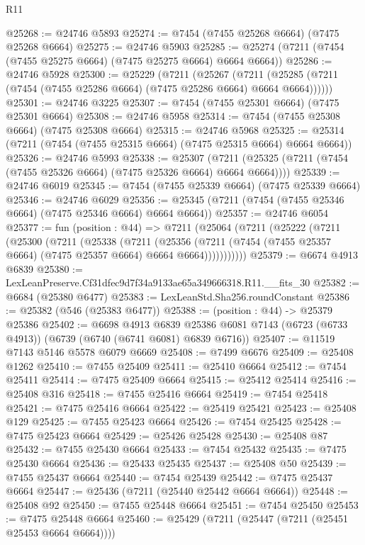 \begin{lexlean}{R11}
\begin{coremodule}
@25268 := @24746 @5893
@25274 := @7454 (@7455 @25268 @6664) (@7475 @25268 @6664)
@25275 := @24746 @5903
@25285 := @25274 (@7211 (@7454 (@7455 @25275 @6664) (@7475 @25275 @6664) @6664 @6664))
@25286 := @24746 @5928
@25300 := @25229
    (@7211
      (@25267
        (@7211 (@25285 (@7211 (@7454 (@7455 @25286 @6664) (@7475 @25286 @6664) @6664 @6664))))))
@25301 := @24746 @3225
@25307 := @7454 (@7455 @25301 @6664) (@7475 @25301 @6664)
@25308 := @24746 @5958
@25314 := @7454 (@7455 @25308 @6664) (@7475 @25308 @6664)
@25315 := @24746 @5968
@25325 := @25314 (@7211 (@7454 (@7455 @25315 @6664) (@7475 @25315 @6664) @6664 @6664))
@25326 := @24746 @5993
@25338 := @25307
    (@7211 (@25325 (@7211 (@7454 (@7455 @25326 @6664) (@7475 @25326 @6664) @6664 @6664))))
@25339 := @24746 @6019
@25345 := @7454 (@7455 @25339 @6664) (@7475 @25339 @6664)
@25346 := @24746 @6029
@25356 := @25345 (@7211 (@7454 (@7455 @25346 @6664) (@7475 @25346 @6664) @6664 @6664))
@25357 := @24746 @6054
@25377 := fun (position : @44) =>
  @7211
    (@25064
      (@7211
        (@25222
          (@7211
            (@25300
              (@7211
                (@25338
                  (@7211
                    (@25356
                      (@7211 (@7454 (@7455 @25357 @6664) (@7475 @25357 @6664) @6664 @6664)))))))))))
@25379 := @6674 @4913 @6839
@25380 := LexLeanPreserve.Cf31dfec9d7f34a9133ae65a349666318.R11.__fits_30
@25382 := @6684 (@25380 @6477)
@25383 := LexLeanStd.Sha256.roundConstant
@25386 := @25382 (@546 (@25383 @6477))
@25388 := (position : @44) -> @25379 @25386
@25402 := @6698
    @4913
    @6839
    @25386
    @6081
    @7143
    (@6723 (@6733 @4913))
    (@6739 (@6740 (@6741 @6081) @6839 @6716))
@25407 := @11519 @7143 @5146 @5578 @6079 @6669
@25408 := @7499 @6676
@25409 := @25408 @1262
@25410 := @7455 @25409
@25411 := @25410 @6664
@25412 := @7454 @25411
@25414 := @7475 @25409 @6664
@25415 := @25412 @25414
@25416 := @25408 @316
@25418 := @7455 @25416 @6664
@25419 := @7454 @25418
@25421 := @7475 @25416 @6664
@25422 := @25419 @25421
@25423 := @25408 @129
@25425 := @7455 @25423 @6664
@25426 := @7454 @25425
@25428 := @7475 @25423 @6664
@25429 := @25426 @25428
@25430 := @25408 @87
@25432 := @7455 @25430 @6664
@25433 := @7454 @25432
@25435 := @7475 @25430 @6664
@25436 := @25433 @25435
@25437 := @25408 @50
@25439 := @7455 @25437 @6664
@25440 := @7454 @25439
@25442 := @7475 @25437 @6664
@25447 := @25436 (@7211 (@25440 @25442 @6664 @6664))
@25448 := @25408 @92
@25450 := @7455 @25448 @6664
@25451 := @7454 @25450
@25453 := @7475 @25448 @6664
@25460 := @25429 (@7211 (@25447 (@7211 (@25451 @25453 @6664 @6664))))

\end{coremodule}
\end{lexlean}
